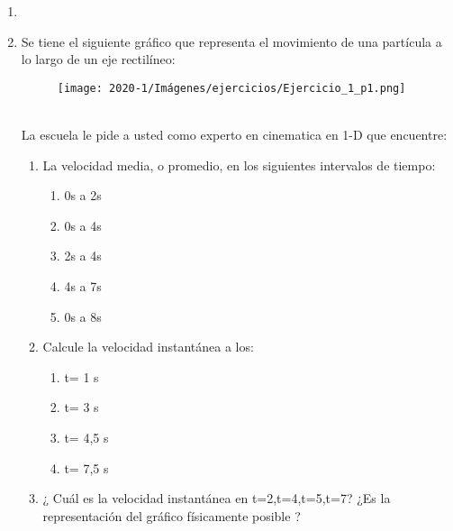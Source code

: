 \documentclass[letterpaper,11pt]{article}
\begin{document}
\vspace{-1cm}
\begin{enumerate}\setlength{\itemsep}{0.4cm}


\item[]

\item Se tiene el siguiente gráfico que representa el movimiento de una partícula a lo largo de un eje rectilíneo:\\
    \begin{figure}[h!]
        \centering
        \texttt{[image: 2020-1/Imágenes/ejercicios/Ejercicio\_1\_p1.png]}
    \end{figure}
\\ La escuela le pide a usted como experto en cinematica en 1-D que encuentre:
\begin{enumerate}
    \item La velocidad media, o promedio, en los siguientes intervalos de tiempo:
        \begin{enumerate}
            \item 0s a 2s
            \item 0s a 4s
            \item 2s a 4s
            \item 4s a 7s 
            \item 0s a 8s
        \end{enumerate}
    \item Calcule la velocidad instantánea a los:
        \begin{enumerate}
            \item t= 1 s
            \item t= 3 s
            \item t= 4,5 s
            \item t= 7,5 s
        \end{enumerate}
    \item ¿ Cuál es la velocidad instantánea en t=2,t=4,t=5,t=7? ¿Es la representación del gráfico físicamente posible ?
\end{enumerate}

\end{enumerate}
\end{document}
